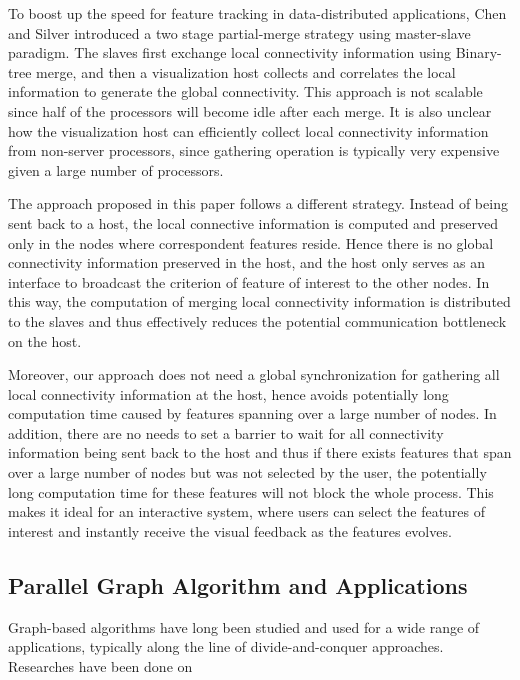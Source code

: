 \documentclass[10pt, conference, compsocconf]{IEEEtran}
\begin{document}
To boost up the speed for feature tracking in data-distributed applications, Chen and Silver \cite{Chen2003} introduced a two stage partial-merge strategy using master-slave paradigm. The slaves first exchange local connectivity information using Binary-tree merge, and then a visualization host collects and correlates the local information to generate the global connectivity. This approach is not scalable since half of the processors will become idle after each merge. It is also unclear how the visualization host can efficiently collect local connectivity information from non-server processors, since gathering operation is typically very expensive given a large number of processors. 

The approach proposed in this paper follows a different strategy. Instead of being sent back to a host, the local connective information is computed and preserved only in the nodes where correspondent features reside. Hence there is no global connectivity information preserved in the host, and the host only serves as an interface to broadcast the criterion of feature of interest to the other nodes. In this way, the computation of merging local connectivity information is distributed to the slaves and thus effectively reduces the potential communication bottleneck on the host.

Moreover, our approach does not need a global synchronization for gathering all local connectivity information at the host, hence avoids potentially long computation time caused by features spanning over a large number of nodes. In addition, there are no needs to set a barrier to wait for all connectivity information being sent back to the host and thus if there exists features that span over a large number of nodes but was not selected by the user, the potentially long computation time for these features will not block the whole process. This makes it ideal for an interactive system, where users can select the features of interest and instantly receive the visual feedback as the features evolves.

\subsection{Parallel Graph Algorithm and Applications}
Graph-based algorithms have long been studied and used for a wide range of applications, typically along the line of divide-and-conquer approaches. Researches have been done on 
\end{document}
